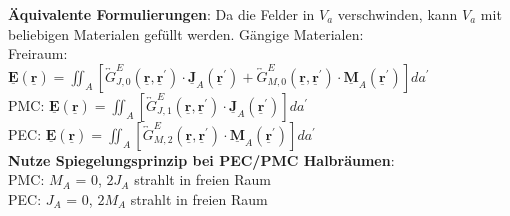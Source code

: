 \documentclass[english]{latex4ei/latex4ei_sheet}
\renewcommand{\vec}[1]{\underline{\boldsymbol{#1}}}
\begin{document}
\begin{sectionbox}
    \textbf{Äquivalente Formulierungen}: Da die Felder in $V_a$ verschwinden, kann $V_a$ mit beliebigen Materialen gefüllt werden. Gängige Materialen:\\
    Freiraum:\\
    $\vec{E}(\vec{r})=\iint_{A}\left[\overleftrightarrow{G}_{J, 0}^{E}\left(\vec{r}, \vec{r}^{\prime}\right) \cdot \vec{J}_{A}\left(\vec{r}^{\prime}\right)+\overleftrightarrow{G}_{M, 0}^{E}\left(\vec{r}, \vec{r}^{\prime}\right) \cdot \vec{M}_{A}\left(\vec{r}^{\prime}\right)\right] d a^{\prime}$\\
    PMC: $\vec{E}(\vec{r})=\iint_{A}\left[\overleftrightarrow{G}_{J, 1}^{E}\left(\vec{r}, \vec{r}^{\prime}\right) \cdot \vec{J}_{A}\left(\vec{r}^{\prime}\right)\right] d a^{\prime}$\\
    PEC: $\vec{E}(\vec{r})=\iint_{A}\left[\overleftrightarrow{G}_{M, 2}^{E}\left(\vec{r}, \vec{r}^{\prime}\right) \cdot \vec{M}_{A}\left(\vec{r}^{\prime}\right)\right] d a^{\prime}$\\

    \textbf{Nutze Spiegelungsprinzip bei PEC/PMC Halbräumen}:\\
    PMC: $M_A$ = 0, $2J_A$ strahlt in freien Raum\\
    PEC: $J_A$ = 0, $2M_A$ strahlt in freien Raum\\
\end{sectionbox}
\end{document}
